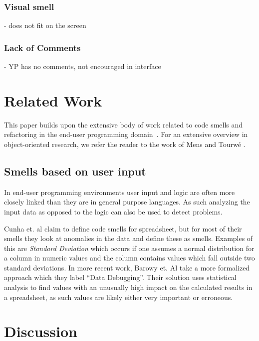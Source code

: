 \documentclass{sig-alternate}
\begin{document}
	\subsubsection{Visual smell}
	 - does not fit on the screen
	 
	\subsubsection{Lack of Comments}
	 - YP has no comments, not encouraged in interface

\section{Related Work}

\label{sec:related_work}
This paper builds upon the extensive body of work related to code smells and refactoring in the end-user programming domain~\cite{Stolee2015, Stolee2011, StoleeTSE2013, Hermans2011, Hermans2012intra, Hermans2012inter, hermans2014bumblebee, chambers2013smell, chambers2015impact}. For an extensive overview in object-oriented research, we refer the reader to the work of Mens and Tourw\'{e} \cite{mens2004survey}.

\subsection{Smells based on user input}
\label{subsec:related_datasmells}
In end-user programming environments user input and logic are often more closely linked than they are in general purpose languages.
As such analyzing the input data as opposed to the logic can also be used to detect problems.

Cunha et. al \cite{cunha2012towards} claim to define code smells for spreadsheet, but for most of their smells they look at  anomalies in the data and define these as smells.
Examples of this are \textit{Standard Deviation} which occurs if one assumes a normal distribution for a column in numeric values and the column contains values which fall outside two standard deviations.
In more recent work, Barowy et. Al \cite{barowy2014checkcell} take a  more formalized approach which they label ``Data Debugging''.
Their solution uses statistical analysis to find values with an unusually high impact on the calculated results in a spreadsheet, as such values are likely either very important or erroneous.





\section{Discussion}
\label{sec:discussion}
\end{document}
